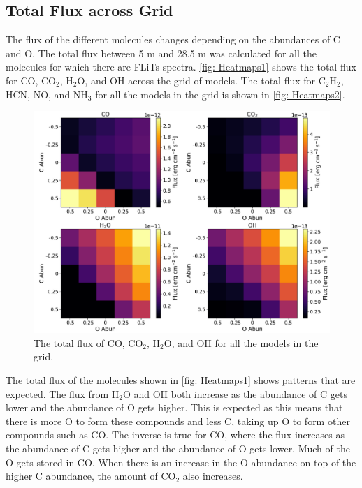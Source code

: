 \documentclass[oneside, single, authoryear, semicolon, 12pt]{lion-msc}
\newcommand{\4}{$_4$}
\newcommand{\3}{$_3$}
\newcommand{\2}{$_2$}
\begin{document}
\subsection{Total Flux across Grid}
The flux of the different molecules changes depending on the abundances of C and O. The total flux between 5 \textmu m and 28.5 \textmu m was calculated for all the molecules for which there are FLiTs spectra. \autoref{fig: Heatmaps1} shows the total flux for CO, CO\2, H\2O, and OH across the grid of models. The total flux for C\2H\2, HCN, NO, and NH\3 for all the models in the grid is shown in \autoref{fig: Heatmaps2}. 

\begin{figure}[H]
    \centering
    \includegraphics[width=\linewidth]{Figures/Heatmaps1.pdf}
    \caption{The total flux of CO, CO\2, H\2O, and OH for all the models in the grid.}
    \label{fig: Heatmaps1}
\end{figure}

The total flux of the molecules shown in \autoref{fig: Heatmaps1} shows patterns that are expected. The flux from H\2O and OH both increase as the abundance of C gets lower and the abundance of O gets higher. This is expected as this means that there is more O to form these compounds and less C, taking up O to form other compounds such as CO. The inverse is true for CO, where the flux increases as the abundance of C gets higher and the abundance of O gets lower. Much of the O gets stored in CO. When there is an increase in the O abundance on top of the higher C abundance, the amount of CO\2 also increases. 
\end{document}
